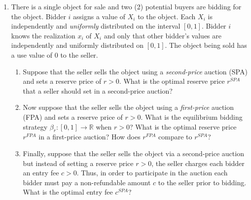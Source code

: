 \documentclass[11pt]{article}
\begin{document}
\begin{enumerate}[itemsep=1em]
  \item There is a single object for sale and two (2) potential buyers are bidding for the object. Bidder $i$ assigns a value of $X_i$ to the object. Each $X_i$ is independently and \emph{uniformly} distributed on the interval $[0, 1]$. Bidder $i$ knows the realization $x_i$ of $X_i$ and only that other bidder's values are independently and uniformly distributed on $[0, 1]$. The object being sold has a use value of $0$ to the seller.
    \begin{enumerate}[label=(\alph*), itemsep=0.6em, topsep=0.4em]
      \item Suppose that the seller sells the object using a \emph{second-price} auction (SPA) and sets a reserve price of $r > 0$. What is the optimal reserve price $r^{SPA}$ that a seller should set in a second-price auction?
      \item Now suppose that the seller sells the object using a \emph{first-price} auction (FPA) and sets a reserve price of $r > 0$. What is the equilibrium bidding strategy $\beta_r : [0, 1] \to \mathbb{R}$ when $r > 0$? What is the optimal reserve price $r^{FPA}$ in a first-price auction? How does $r^{FPA}$ compare to $r^{SPA}$?
      \item Finally, suppose that the seller sells the object via a second-price auction but instead of setting a reserve price $r > 0$, the seller charges each bidder an entry fee $c > 0$. Thus, in order to participate in the auction each bidder must pay a non-refundable amount $c$ to the seller prior to bidding. What is the optimal entry fee $c^{SPA}$?
    \end{enumerate}

\end{enumerate}
\end{document}
